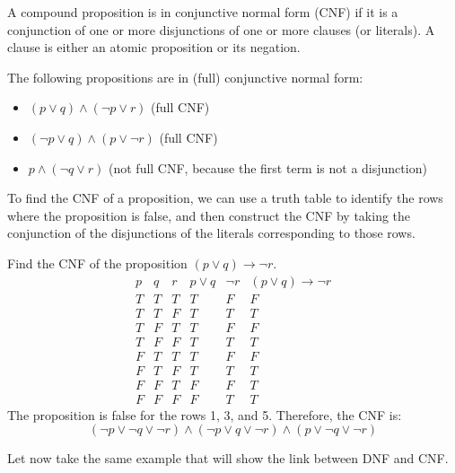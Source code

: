\begin{definition}
    A compound proposition is in conjunctive normal form (CNF) if it is a conjunction of one or more disjunctions of one or more clauses (or literals). A clause is either an atomic proposition or its negation.
\end{definition}
\begin{eg}
    The following propositions are in (full) conjunctive normal form:
    \begin{itemize}[itemsep=1pt,label=$\circ$]
        \item \((p \lor q) \land (\neg p \lor r)\) (full CNF)
        \item \((\neg p \lor q) \land (p \lor \neg r)\) (full CNF)
        \item \(p \land (\neg q \lor r)\) (not full CNF, because the first term is not a disjunction)
    \end{itemize}
\end{eg}
To find the CNF of a proposition, we can use a truth table to identify the rows where the proposition is false, and then construct the CNF by taking the conjunction of the disjunctions of the literals corresponding to those rows.
\begin{eg}
    Find the CNF of the proposition $(p \lor q) \to \neg r$.
    \[
        \begin{array}{c|c|c|c|c|c}
            p & q & r & p \lor q & \neg r & (p \lor q) \to \neg r \\
            \hline
            T & T & T & T & F & F \\
            T & T & F & T & T & T \\
            T & F & T & T & F & F \\
            T & F & F & T & T & T \\
            F & T & T & T & F & F \\
            F & T & F & T & T & T \\
            F & F & T & F & F & T \\
            F & F & F & F & T & T
        \end{array}
    \]
    The proposition is false for the rows 1, 3, and 5. Therefore, the CNF is:
    \[ ( \neg p \lor \neg q \lor \neg r) \land ( \neg p \lor q \lor \neg r) \land (p \lor \neg q \lor \neg r) \]
\end{eg}
Let now take the same example that will show the link between DNF and CNF.
